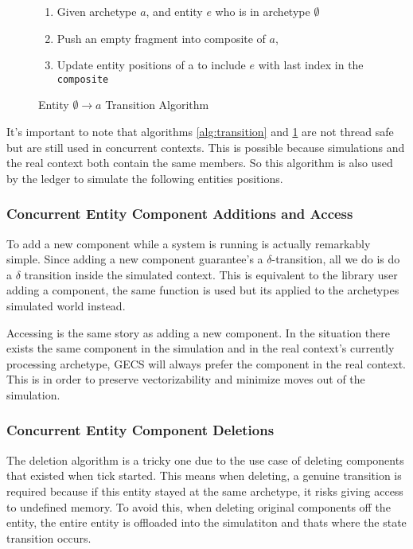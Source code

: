 \begin{figure}[H]
\begin{enumerate}
    \item Given archetype $a$, and entity $e$ who is in archetype $\emptyset$ 
    \item Push an empty fragment into composite of $a$,
    \item Update entity positions of a to include $e$ with last index in the \texttt{composite}
\end{enumerate}
\caption{Entity $\emptyset \rightarrow a$ Transition Algorithm}
\label{alg:empty_to_a}
\end{figure}

It's important to note that algorithms \ref{alg:transition} and \ref{alg:empty_to_a} are not thread safe but are still used in concurrent contexts. This is possible because simulations and the real context both contain the same members. So this algorithm is also used by the ledger to simulate the following entities positions.

\subsubsection{Concurrent Entity Component Additions and Access}
To add a new component while a system is running is actually remarkably simple. Since adding a new component guarantee's a $\delta$-transition, all we do is do a $\delta$ transition inside the simulated context. This is equivalent to the library user adding a component, the same function is used but its applied to the archetypes simulated world instead. 

Accessing is the same story as adding a new component. In the situation there exists the same component in the simulation and in the real context's currently processing archetype, GECS will always prefer the component in the real context. This is in order to preserve vectorizability and minimize moves out of the simulation.

\subsubsection{Concurrent Entity Component Deletions}
The deletion algorithm is a tricky one due to the use case of deleting components that existed when tick started. This means when deleting, a genuine transition is required because if this entity stayed at the same archetype, it risks giving access to undefined memory. To avoid this, when deleting original components off the entity, the entire entity is offloaded into the simulatiton and thats where the state transition occurs. 

